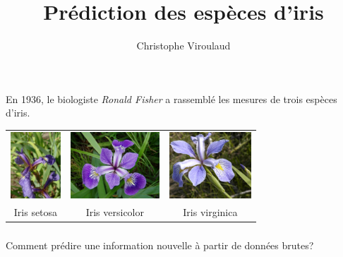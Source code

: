 \documentclass[svgnames,11pt]{beamer}
\author[]{Christophe Viroulaud}
\title{Prédiction des espèces d'iris}
\date{\framebox{\textbf{Algo 06}}}
\institute{Première - NSI}
\begin{document}
\begin{frame}
    \titlepage
\end{frame}

\begin{frame}
    \frametitle{}

    En 1936, le biologiste \emph{Ronald Fisher} a rassemblé les mesures de trois espèces d'iris.
    \begin{center}
        \begin{tabular}{ccc}
            \includegraphics[height=2.5cm]{ressources/iris-setosa.jpg}     &
            \includegraphics[height=2.5cm]{ressources/iris-versicolor.jpg} &
            \includegraphics[height=2.5cm]{ressources/iris-virginica.jpg}                                     \\
            Iris setosa                                                    & Iris versicolor & Iris virginica \\
        \end{tabular}
    \end{center}

\end{frame}

\begin{frame}
    \frametitle{}
    \begin{framed}
        \centering Comment prédire une information nouvelle à partir de données brutes?
    \end{framed}

\end{frame}
\end{document}
